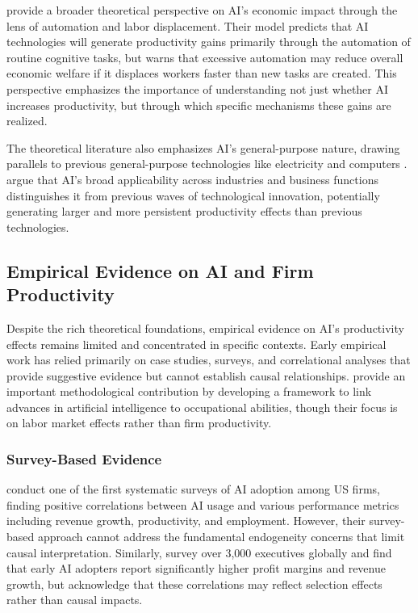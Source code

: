 \documentclass[12pt, a4paper]{article}
\begin{document}
\citet{acemoglu2018race} provide a broader theoretical perspective on AI's economic impact through the lens of automation and labor displacement. Their model predicts that AI technologies will generate productivity gains primarily through the automation of routine cognitive tasks, but warns that excessive automation may reduce overall economic welfare if it displaces workers faster than new tasks are created. This perspective emphasizes the importance of understanding not just whether AI increases productivity, but through which specific mechanisms these gains are realized.

The theoretical literature also emphasizes AI's general-purpose nature, drawing parallels to previous general-purpose technologies like electricity and computers \citep{bresnahan1995general}. \citet{goldfarb2019digital} argue that AI's broad applicability across industries and business functions distinguishes it from previous waves of technological innovation, potentially generating larger and more persistent productivity effects than previous technologies.

\subsection{Empirical Evidence on AI and Firm Productivity}

Despite the rich theoretical foundations, empirical evidence on AI's productivity effects remains limited and concentrated in specific contexts. Early empirical work has relied primarily on case studies, surveys, and correlational analyses that provide suggestive evidence but cannot establish causal relationships. \citet{felten2018occupational} provide an important methodological contribution by developing a framework to link advances in artificial intelligence to occupational abilities, though their focus is on labor market effects rather than firm productivity.

\subsubsection{Survey-Based Evidence}

\citet{brynjolfsson2017artificial} conduct one of the first systematic surveys of AI adoption among US firms, finding positive correlations between AI usage and various performance metrics including revenue growth, productivity, and employment. However, their survey-based approach cannot address the fundamental endogeneity concerns that limit causal interpretation. Similarly, \citet{mckinsey2018artificial} survey over 3,000 executives globally and find that early AI adopters report significantly higher profit margins and revenue growth, but acknowledge that these correlations may reflect selection effects rather than causal impacts.
\end{document}
